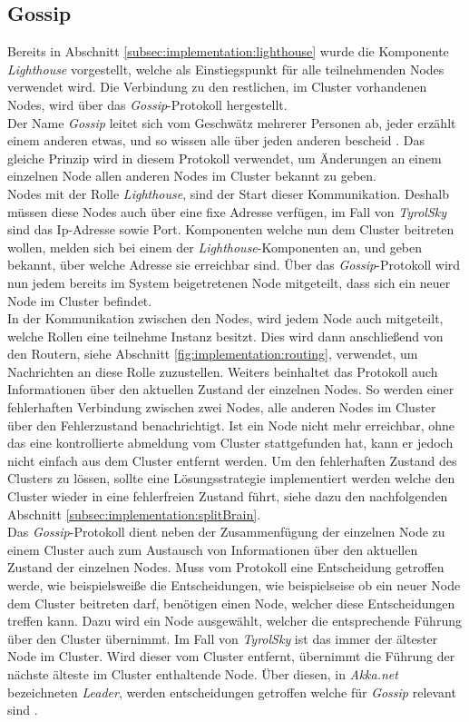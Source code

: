 \subsection{Gossip}
\label{subsec:implementation:gossip}
Bereits in Abschnitt \ref{subsec:implementation:lighthouse} wurde die Komponente \textit{Lighthouse} vorgestellt, welche als Einstiegspunkt für alle teilnehmenden Nodes verwendet wird. Die Verbindung zu den restlichen, im Cluster vorhandenen Nodes, wird über das \textit{Gossip}-Protokoll hergestellt. \\
Der Name \textit{Gossip} leitet sich vom Geschwätz mehrerer Personen ab, jeder erzählt einem anderen etwas, und so wissen alle über jeden anderen  bescheid \citep{Akka.netCommunityAkka.NETDocumentation}. Das gleiche Prinzip wird in diesem Protokoll verwendet, um Änderungen an einem einzelnen Node allen anderen Nodes im Cluster bekannt zu geben. \\
Nodes mit der Rolle \textit{Lighthouse}, sind der Start dieser Kommunikation. Deshalb müssen diese Nodes auch über eine fixe Adresse verfügen, im Fall von \textit{TyrolSky} sind das Ip-Adresse sowie Port. Komponenten welche nun dem Cluster beitreten wollen, melden sich bei einem der \textit{Lighthouse}-Komponenten an, und geben bekannt, über welche Adresse sie erreichbar sind. Über das \textit{Gossip}-Protokoll wird nun jedem bereits im System beigetretenen Node mitgeteilt, dass sich ein neuer Node im Cluster befindet. \\
In der Kommunikation zwischen den Nodes, wird jedem Node auch mitgeteilt, welche Rollen eine teilnehme Instanz besitzt. Dies wird dann anschließend von den Routern, siehe Abschnitt \ref{fig:implementation:routing}, verwendet, um Nachrichten an diese Rolle zuzustellen. Weiters beinhaltet das Protokoll auch Informationen über den aktuellen Zustand der einzelnen Nodes. So werden einer fehlerhaften Verbindung zwischen zwei Nodes, alle anderen Nodes im Cluster über den Fehlerzustand benachrichtigt. Ist ein Node nicht mehr erreichbar, ohne das eine kontrollierte abmeldung vom Cluster stattgefunden hat, kann er jedoch nicht einfach aus dem Cluster entfernt werden. Um den fehlerhaften Zustand des Clusters zu lössen, sollte eine Lösungsstrategie implementiert werden welche den Cluster wieder in eine fehlerfreien Zustand führt, siehe dazu den nachfolgenden Abschnitt \ref{subsec:implementation:splitBrain}. \\ 
Das \textit{Gossip}-Protokoll dient neben der Zusammenfügung der einzelnen Node zu einem Cluster auch zum Austausch von Informationen über den aktuellen Zustand der einzelnen Nodes. Muss vom Protokoll eine Entscheidung getroffen werde, wie beispielsweiße die Entscheidungen, wie beispielseise ob ein neuer Node dem Cluster beitreten darf, benötigen einen Node, welcher diese Entscheidungen treffen kann. Dazu wird ein Node ausgewählt, welcher die entsprechende Führung über den Cluster übernimmt. Im Fall von \textit{TyrolSky} ist das immer der ältester Node im Cluster. Wird dieser vom Cluster entfernt, übernimmt die Führung der nächste älteste im Cluster enthaltende Node. Über diesen, in \textit{Akka.net} bezeichneten \textit{Leader}, werden entscheidungen getroffen welche für \textit{Gossip} relevant sind \citep{akkaInAction}.  


